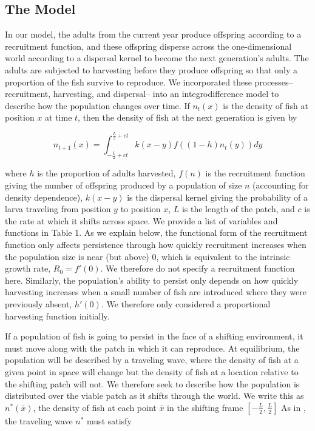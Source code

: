 \documentclass[]{article}
\begin{document}
\subsection{The Model }

In our model, the adults from the current year produce offspring according to a recruitment function, and these 
offspring disperse across the one-dimensional world according to a dispersal kernel to become the next 
generation's adults. The adults are subjected to harvesting before they produce offspring so that only a 
proportion of the fish survive to reproduce. We incorporated these processes-- recruitment, harvesting, and 
dispersal-- into an integrodifference model to describe how the population changes over time. If $n_t(x)$ 
is the density of fish at position $x$ at time $t$, then the density of fish at the next generation is given by

\begin{equation}
n_{t+1}(x)=\int^{\frac{L}{2}+ct}_{-\frac{L}{2}+ct}k(x-y)f((1-h)n_t(y))dy \label{integrodifference}
\end{equation}

\noindent where $h$ is the proportion of adults harvested, $f(n)$ is the recruitment function giving the number of 
offspring produced by a population of size $n$ (accounting for density dependence), $k(x-y)$ is the dispersal kernel giving the probability of a 
larva traveling from position $y$ to position $x$, $L$ is the length of the patch, and $c$ is the rate at which it 
shifts across space. We provide a list of variables and functions in Table 1.  As we explain below, the functional form of the 
recruitment function only affects persistence through how quickly recruitment increases when the population 
size is near (but above) $0$, which is equivalent to the intrinsic growth rate, $R_0=f'(0)$. We therefore do not specify a 
recruitment function here. Similarly, the population's ability to persist only depends on how quickly harvesting 
increases when a small number of fish are introduced where they were previously absent, $h'(0)$. We 
therefore only considered a proportional harvesting function initially.

If a population of fish is going to persist in the face of a shifting environment, it must move along with the patch 
 in which it can reproduce. At equilibrium, the population will be described by a traveling wave, 
where the density of fish at a given point in space will change but the density of fish at a location relative to the 
shifting  patch will not. We therefore seek to describe how the population is distributed over the viable 
patch as it shifts through the world. We write this as $n^*(\bar{x})$, the density of fish at each point $\bar{x}$ in 
the shifting frame $\left[-\frac{L}{2}, \frac{L}{2}\right]$ As in \citet{ZhouKot2011}, the traveling wave $n^*$ must 
satisfy
\end{document}
